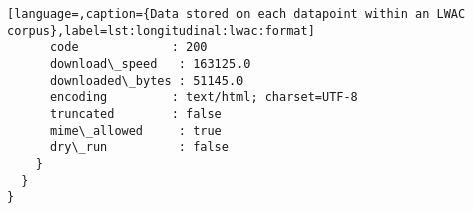 \begin{lstlisting}[language=,caption={Data stored on each datapoint within an LWAC corpus},label=lst:longitudinal:lwac:format]
      code             : 200                                               
      download\_speed   : 163125.0                                          
      downloaded\_bytes : 51145.0                                           
      encoding         : text/html; charset=UTF-8                          
      truncated        : false                                             
      mime\_allowed     : true                                              
      dry\_run          : false                                             
    }
  }
}
\end{lstlisting}

